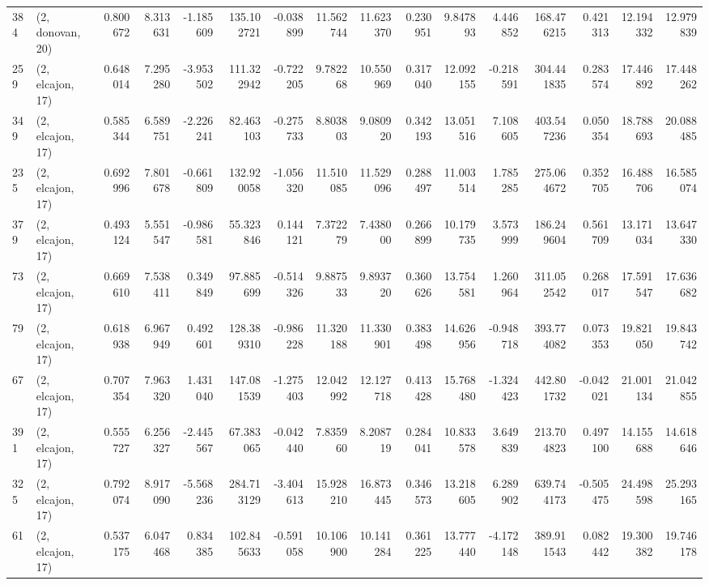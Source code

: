 \begin{tabular}{llrrrrrrrrrrrrrr}
384 &  (2, donovan, 20) &   0.800672 &   8.313631 &  -1.185609 &   135.102721 &  -0.038899 &  11.562744 &  11.623370 &  0.230951 &   9.847893 &   4.446852 &   168.476215 &   0.421313 &  12.194332 &  12.979839 \\
259 &  (2, elcajon, 17) &   0.648014 &   7.295280 &  -3.953502 &   111.322942 &  -0.722205 &   9.782268 &  10.550969 &  0.317040 &  12.092155 &  -0.218591 &   304.441835 &   0.283574 &  17.446892 &  17.448262 \\
349 &  (2, elcajon, 17) &   0.585344 &   6.589751 &  -2.226241 &    82.463103 &  -0.275733 &   8.803803 &   9.080920 &  0.342193 &  13.051516 &   7.108605 &   403.547236 &   0.050354 &  18.788693 &  20.088485 \\
235 &  (2, elcajon, 17) &   0.692996 &   7.801678 &  -0.661809 &   132.920058 &  -1.056320 &  11.510085 &  11.529096 &  0.288497 &  11.003514 &   1.785285 &   275.064672 &   0.352705 &  16.488706 &  16.585074 \\
379 &  (2, elcajon, 17) &   0.493124 &   5.551547 &  -0.986581 &    55.323846 &   0.144121 &   7.372279 &   7.438000 &  0.266899 &  10.179735 &   3.573999 &   186.249604 &   0.561709 &  13.171034 &  13.647330 \\
73  &  (2, elcajon, 17) &   0.669610 &   7.538411 &   0.349849 &    97.885699 &  -0.514326 &   9.887533 &   9.893720 &  0.360626 &  13.754581 &   1.260964 &   311.052542 &   0.268017 &  17.591547 &  17.636682 \\
79  &  (2, elcajon, 17) &   0.618938 &   6.967949 &   0.492601 &   128.389310 &  -0.986228 &  11.320188 &  11.330901 &  0.383498 &  14.626956 &  -0.948718 &   393.774082 &   0.073353 &  19.821050 &  19.843742 \\
67  &  (2, elcajon, 17) &   0.707354 &   7.963320 &   1.431040 &   147.081539 &  -1.275403 &  12.042992 &  12.127718 &  0.413428 &  15.768480 &  -1.324423 &   442.801732 &  -0.042021 &  21.001134 &  21.042855 \\
391 &  (2, elcajon, 17) &   0.555727 &   6.256327 &  -2.445567 &    67.383065 &  -0.042440 &   7.835960 &   8.208719 &  0.284041 &  10.833578 &   3.649839 &   213.704823 &   0.497100 &  14.155688 &  14.618646 \\
325 &  (2, elcajon, 17) &   0.792074 &   8.917090 &  -5.568236 &   284.713129 &  -3.404613 &  15.928210 &  16.873445 &  0.346573 &  13.218605 &   6.289902 &   639.744173 &  -0.505475 &  24.498598 &  25.293165 \\
61  &  (2, elcajon, 17) &   0.537175 &   6.047468 &   0.834385 &   102.845633 &  -0.591058 &  10.106900 &  10.141284 &  0.361225 &  13.777440 &  -4.172148 &   389.911543 &   0.082442 &  19.300382 &  19.746178 \\

\end{tabular}
